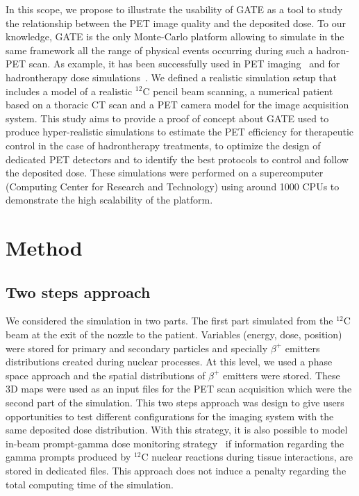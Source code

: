 \documentclass[11pt]{iopart}
\begin{document}
In this scope, we propose to illustrate the usability of GATE as a
tool to study the relationship between the PET image quality and the
deposited dose. To our knowledge, GATE is the only Monte-Carlo
platform allowing to simulate in the same framework all the range of
physical events occurring during such a hadron-PET scan. As example,
it has been successfully used in PET imaging~\cite{Buvat2006a} and for
hadrontherapy dose simulations~\cite{Jan2011, Grevillot2011a}. We
defined a realistic simulation setup that includes a model of a
realistic $^{12}$C pencil beam scanning, a numerical patient based on
a thoracic CT scan and a PET camera model for the image acquisition
system. This study aims to provide a proof of concept about GATE used
to produce hyper-realistic simulations to estimate the PET efficiency
for therapeutic control in the case of hadrontherapy treatments, to
optimize the design of dedicated PET detectors and to identify the
best protocols to control and follow the deposited dose. These
simulations were performed on a supercomputer (Computing Center for
Research and Technology) using around 1000 CPUs to demonstrate the
high scalability of the platform.



\section{Method}



\subsection{Two steps approach}

We considered the simulation in two parts. The first part simulated
from the $^{12}$C beam at the exit of the nozzle to the
patient. Variables (energy, dose, position) were stored for primary
and secondary particles and specially $\beta^+$ emitters distributions
created during nuclear processes. At this level, we used a phase space
approach and the spatial distributions of $\beta^+$ emitters were
stored. These 3D maps were used as an input files for the PET scan
acquisition which were the second part of the simulation. This two
steps approach was design to give users opportunities to test
different configurations for the imaging system with the same
deposited dose distribution. With this strategy, it is also possible
to model in-beam prompt-gamma dose monitoring
strategy~\cite{Testa2008, Moteabbed2011} if information regarding the
gamma prompts produced by $^{12}$C nuclear reactions during tissue
interactions, are stored in dedicated files.  This approach does not
induce a penalty regarding the total computing time of the simulation.
\end{document}
